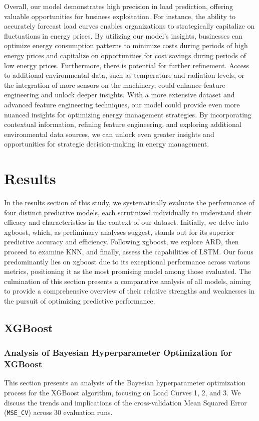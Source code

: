 \documentclass{article} %
\begin{document}
Overall, our model demonstrates high precision in load prediction, offering valuable opportunities for business exploitation. For instance, the ability to accurately forecast load curves enables organizations to strategically capitalize on fluctuations in energy prices. By utilizing our model's insights, businesses can optimize energy consumption patterns to minimize costs during periods of high energy prices and capitalize on opportunities for cost savings during periods of low energy prices. Furthermore, there is potential for further refinement. Access to additional environmental data, such as temperature and radiation levels, or the integration of more sensors on the machinery, could enhance feature engineering and unlock deeper insights. With a more extensive dataset and advanced feature engineering techniques, our model could provide even more nuanced insights for optimizing energy management strategies. By incorporating contextual information, refining feature engineering, and exploring additional environmental data sources, we can unlock even greater insights and opportunities for strategic decision-making in energy management.

\section{Results}
In the results section of this study, we systematically evaluate the performance of four distinct predictive models, each scrutinized individually to understand their efficacy and characteristics in the context of our dataset. Initially, we delve into \gls{xgboost}, which, as preliminary analyses suggest, stands out for its superior predictive accuracy and efficiency. Following \gls{xgboost}, we explore \gls{ARD}, then proceed to examine \gls{KNN}, and finally, assess the capabilities of \gls{LSTM}. Our focus predominantly lies on \gls{xgboost} due to its exceptional performance across various metrics, positioning it as the most promising model among those evaluated. The culmination of this section presents a comparative analysis of all models, aiming to provide a comprehensive overview of their relative strengths and weaknesses in the pursuit of optimizing predictive performance. 

\subsection{XGBoost}

\subsubsection{Analysis of Bayesian Hyperparameter Optimization for XGBoost}
This section presents an analysis of the Bayesian hyperparameter optimization process for the XGBoost algorithm, focusing on Load Curves 1, 2, and 3. We discuss the trends and implications of the cross-validation Mean Squared Error (\texttt{MSE\_CV}) across 30 evaluation runs.
\end{document}
